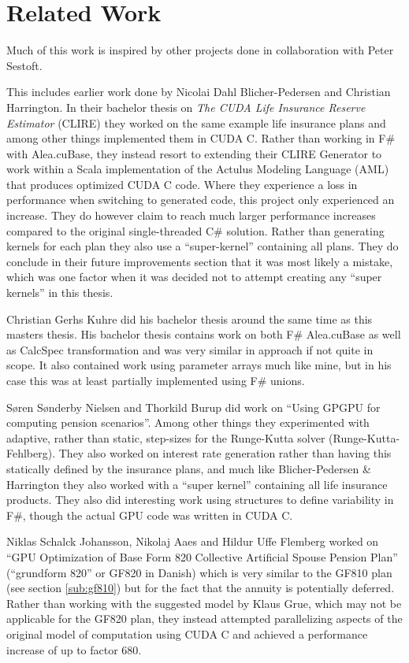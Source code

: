\section{Related Work}\label{sec:relatedwork}
Much of this work is inspired by other projects done in collaboration with Peter Sestoft.

This includes earlier work done by Nicolai Dahl Blicher-Pedersen and Christian Harrington.
In their bachelor thesis on \emph{The CUDA Life Insurance Reserve Estimator} (CLIRE)\cite{dahlharrington} they worked on the same example life insurance plans and among other things implemented them in CUDA C.
Rather than working in F\# with Alea.cuBase, they instead resort to extending their CLIRE Generator to work within a Scala implementation of the Actulus Modeling Language (AML) that produces optimized CUDA C code.
Where they experience a loss in performance when switching to generated code, this project only experienced an increase.
They do however claim to reach much larger performance increases compared to the original single-threaded C\# solution.
Rather than generating kernels for each plan they also use a ``super-kernel'' containing all plans. 
They do conclude in their future improvements section that it was most likely a mistake, which was one factor when it was decided not to attempt creating any ``super kernels'' in this thesis.

Christian Gerhs Kuhre\cite{christiangk} did his bachelor thesis around the same time as this masters thesis.
His bachelor thesis contains work on both F\# Alea.cuBase as well as CalcSpec transformation and was very similar in approach if not quite in scope.
It also contained work using parameter arrays much like mine, but in his case this was at least partially implemented using F\# unions.

S\o{}ren S\o{}nderby Nielsen and Thorkild Burup did work on ``Using GPGPU for computing pension scenarios''\cite{nielsenburup}. 
Among other things they experimented with adaptive, rather than static, step-sizes for the Runge-Kutta solver (Runge-Kutta-Fehlberg).
They also worked on interest rate generation rather than having this statically defined by the insurance plans, and much like Blicher-Pedersen \& Harrington they also worked with a ``super kernel'' containing all life insurance products.
They also did interesting work using structures to define variability in F\#, though the actual GPU code was written in CUDA C.

Niklas Schalck Johansson, Nikolaj Aaes and Hildur Uffe Flemberg worked on ``GPU Optimization of Base Form 820 Collective Artificial Spouse Pension Plan''\cite{aaesjohanssonflemberg} (``grundform 820'' or GF820 in Danish) which is very similar to the GF810 plan (see section \ref{sub:gf810}) but for the fact that the annuity is potentially deferred. 
Rather than working with the suggested model by Klaus Grue, which may not be applicable for the GF820 plan, they instead attempted parallelizing aspects of the original model of computation using CUDA C and achieved a performance increase of up to factor 680.
